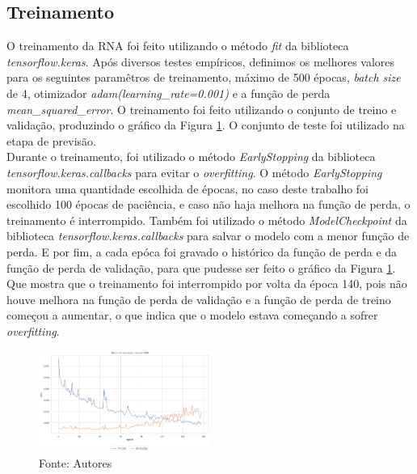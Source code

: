 \documentclass[
	article,			%
	12pt,				%
	a4paper,			%
	chapter=TITLE,		%
	section=TITLE,		%
	subsection=TITLE,	%
	subsubsection=TITLE %
	english,			%
	brazil,				%
	sumario=tradicional
	]{abntex2}
\begin{document}
\subsection{Treinamento}
O treinamento da RNA foi feito utilizando o método \textit{fit} da biblioteca \textit{tensorflow.keras}. Após diversos testes empíricos, definimos os melhores valores para os seguintes paramêtros de treinamento, máximo de 500 épocas, \textit{batch size} de 4, otimizador \textit{adam(learning\_rate=0.001)} e a função de perda \textit{mean\_squared\_error}. O treinamento foi feito utilizando o conjunto de treino e validação, produzindo o gráfico da Figura \ref{figure4}. O conjunto de teste foi utilizado na etapa de previsão. 
\\ \indent
Durante o treinamento, foi utilizado o método \textit{EarlyStopping} da biblioteca \textit{tensorflow.keras.callbacks} para evitar o \textit{overfitting}. O método \textit{EarlyStopping} monitora uma quantidade escolhida de épocas, no caso deste trabalho foi escolhido 100 épocas de paciência, e caso não haja melhora na função de perda, o treinamento é interrompido. Também foi utilizado o método \textit{ModelCheckpoint} da biblioteca \textit{tensorflow.keras.callbacks} para salvar o modelo com a menor função de perda. E por fim, a cada epóca foi gravado o histórico da função de perda e da função de perda de validação, para que pudesse ser feito o gráfico da Figura \ref{figure4}. Que mostra que o treinamento foi interrompido por volta da época 140, pois não houve melhora na função de perda de validação e a função de perda de treino começou a aumentar, o que indica que o modelo estava começando a sofrer \textit{overfitting}. 
\begin{figure}[htbp]
	\centering
	\includegraphics[width=0.5\textwidth]{imagens/imgCodigos/historicoMSExEpocasTreino.png}
	\caption{Fonte: Autores}
	\label{figure4}
\end{figure}
\end{document}
